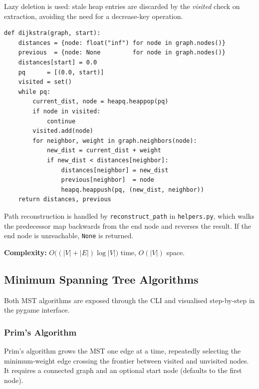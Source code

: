 \documentclass[12pt, a4paper]{article}
\begin{document}
Lazy deletion is used: stale heap entries are discarded by the
\textit{visited} check on extraction, avoiding the need for a
decrease-key operation.

\begin{lstlisting}[caption={Dijkstra core (\texttt{src/algorithms/dijkstra.py}).}]
def dijkstra(graph, start):
    distances = {node: float("inf") for node in graph.nodes()}
    previous  = {node: None         for node in graph.nodes()}
    distances[start] = 0.0
    pq      = [(0.0, start)]
    visited = set()
    while pq:
        current_dist, node = heapq.heappop(pq)
        if node in visited:
            continue
        visited.add(node)
        for neighbor, weight in graph.neighbors(node):
            new_dist = current_dist + weight
            if new_dist < distances[neighbor]:
                distances[neighbor] = new_dist
                previous[neighbor]  = node
                heapq.heappush(pq, (new_dist, neighbor))
    return distances, previous
\end{lstlisting}

Path reconstruction is handled by \texttt{reconstruct\_path} in
\texttt{helpers.py}, which walks the predecessor map backwards from the
end node and reverses the result. If the end node is unreachable,
\texttt{None} is returned.

\textbf{Complexity:} $O\bigl((|V|+|E|)\log|V|\bigr)$ time, $O(|V|)$ space.

\subsection{Minimum Spanning Tree Algorithms}
\label{sec:mst}

Both MST algorithms are exposed through the CLI and visualised
step-by-step in the pygame interface.

\subsubsection{Prim's Algorithm}

Prim's algorithm grows the MST one edge at a time, repeatedly selecting
the minimum-weight edge crossing the frontier between visited and
unvisited nodes. It requires a connected graph and an optional start node
(defaults to the first node).
\end{document}
